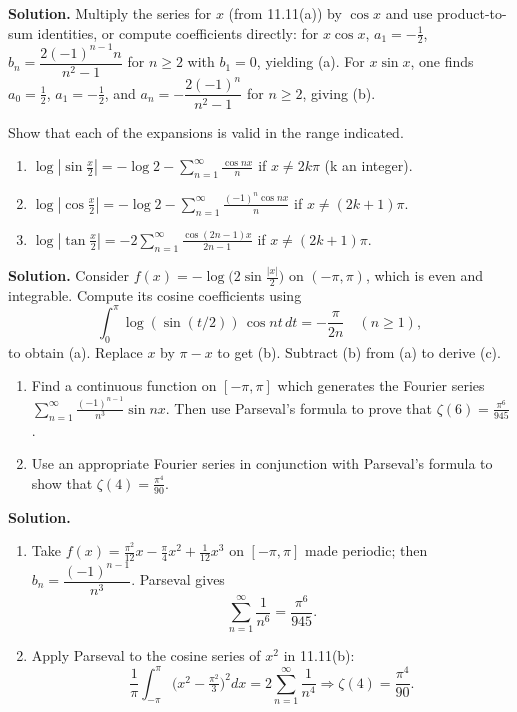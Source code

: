 \noindent\textbf{Solution.}
Multiply the series for $x$ (from 11.11(a)) by $\cos x$ and use product-to-sum identities, or compute coefficients directly: for $x\cos x$, $a_1= -\tfrac{1}{2}$, $b_n=\dfrac{2(-1)^{n-1}n}{n^2-1}$ for $n\ge2$ with $b_1=0$, yielding (a). For $x\sin x$, one finds $a_0=\tfrac{1}{2}$, $a_1=-\tfrac{1}{2}$, and $a_n= -\dfrac{2(-1)^n}{n^2-1}$ for $n\ge2$, giving (b).

\begin{problembox}
Show that each of the expansions is valid in the range indicated.
\begin{enumerate}[label=(\alph*)]
\item $\log \left| \sin \frac{x}{2} \right| = -\log 2 - \sum_{n=1}^\infty \frac{\cos nx}{n}$ if $x \neq 2k\pi$ (k an integer).
\item $\log \left| \cos \frac{x}{2} \right| = -\log 2 - \sum_{n=1}^\infty \frac{(-1)^n \cos nx}{n}$ if $x \neq (2k + 1)\pi$.
\item $\log \left| \tan \frac{x}{2} \right| = -2 \sum_{n=1}^\infty \frac{\cos (2n - 1)x}{2n - 1}$ if $x \neq (2k + 1)\pi$.
\end{enumerate}
\end{problembox}

\noindent\textbf{Solution.}
Consider $f(x)= -\log\big(2\sin\tfrac{|x|}{2}\big)$ on $(-\pi,\pi)$, which is even and integrable. Compute its cosine coefficients using
\[\int_0^{\pi} \log(\sin(t/2))\,\cos nt\,dt = -\frac{\pi}{2n}\quad (n\ge1),\]
to obtain (a). Replace $x$ by $\pi-x$ to get (b). Subtract (b) from (a) to derive (c).

\begin{problembox}
\begin{enumerate}[label=(\alph*)]
\item Find a continuous function on $[-\pi, \pi]$ which generates the Fourier series $\sum_{n=1}^\infty \frac{(-1)^{n-1}}{n^3} \sin nx$. Then use Parseval's formula to prove that $\zeta(6) = \frac{\pi^6}{945}$.
\item Use an appropriate Fourier series in conjunction with Parseval's formula to show that $\zeta(4) = \frac{\pi^4}{90}$.
\end{enumerate}
\end{problembox}

\noindent\textbf{Solution.}
\begin{enumerate}[label=(\alph*)]
\item Take $f(x)=\tfrac{\pi^2}{12}x-\tfrac{\pi}{4}x^2+\tfrac{1}{12}x^3$ on $[-\pi,\pi]$ made periodic; then $b_n=\dfrac{(-1)^{n-1}}{n^3}$. Parseval gives
\[\sum_{n=1}^{\infty}\frac{1}{n^6}=\frac{\pi^6}{945}.\]
\item Apply Parseval to the cosine series of $x^2$ in 11.11(b):
\[\frac{1}{\pi}\int_{-\pi}^{\pi}\big(x^2-\tfrac{\pi^2}{3}\big)^2 dx = 2\sum_{n=1}^{\infty}\frac{1}{n^4}\Rightarrow \zeta(4)=\frac{\pi^4}{90}.\]
\end{enumerate}

